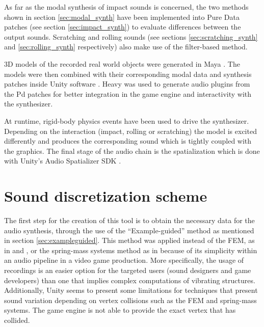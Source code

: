 As far as the modal synthesis of impact sounds is concerned, the two methods shown in section \ref{sec:modal_synth} have been implemented into Pure Data \cite{bib:pd} patches (see section \ref{sec:impact_synth}) to evaluate differences between the output sounds. Scratching and rolling sounds (see sections \ref{sec:scratching_synth} and \ref{sec:rolling_synth} respectively) also make use of the filter-based method.

3D models of the recorded real world objects were generated in Maya \cite{bib:maya}. The models were then combined with their corresponding modal data and synthesis patches inside Unity\textsuperscript{\textregistered} software \cite{bib:unity}. Heavy \cite{bib:heavy} was used to generate audio plugins from the \gls{Pd} patches for better integration in the game engine and interactivity with the synthesizer. 

At runtime, rigid-body physics events have been used to drive the synthesizer. Depending on the interaction (impact, rolling or scratching) the model is excited differently and produces the corresponding sound which is tightly coupled with the graphics. The final stage of the audio chain is the spatialization which is done with Unity\textsuperscript{\textregistered}'s Audio Spatializer \gls{SDK} \cite{bib:unity_doc}.

\section{Sound discretization scheme}\label{sec:discretization}

The first step for the creation of this tool is to obtain the necessary data for the audio synthesis, through the use of the ``Example-guided'' method as mentioned in section \ref{sec:exampleguided}. This method was applied instead of the \gls{FEM}, as in \cite{director2001synthesizing} and \cite{o2002synthesizing}, or the spring-mass systems method as in \cite{raghuvanshi2006interactive} because of its simplicity within an audio pipeline in a video game production. More specifically, the usage of recordings is an easier option for the targeted users (sound designers and game developers) than one that implies complex computations of vibrating structures. Additionally, Unity\textsuperscript{\textregistered} seems to present some limitations for techniques that present sound variation depending on vertex collisions such as the \gls{FEM} and spring-mass systems. The game engine is not able to provide the exact vertex that has collided. 

